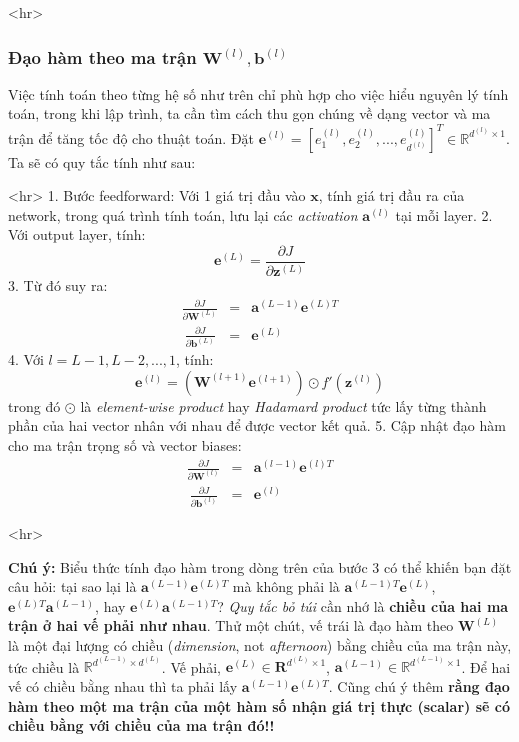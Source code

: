 <hr> 
 
 
 
\subsubsection{Đạo hàm theo ma trận $\mathbf{W}^{(l)}, \mathbf{b}^{(l)}$}
Việc tính toán theo từng hệ số như trên chỉ phù hợp cho việc hiểu nguyên lý tính toán, trong khi lập trình, ta cần tìm cách thu gọn chúng về dạng vector và ma trận để tăng tốc độ cho thuật toán. Đặt $\mathbf{e}^{(l)} = [e_1^{(l)}, e_2^{(l)}, ..., e_{d^{(l)}}^{(l)}]^T \in \mathbb{R}^{d^{(l)}\times 1} $. Ta sẽ có quy tắc tính như sau: 
 
<hr> 
1. Bước feedforward: Với 1 giá trị đầu vào $\mathbf{x}$, tính giá trị đầu ra của network, trong quá trình tính toán, lưu lại các \textit{activation} $\mathbf{a}^{(l)}$ tại mỗi layer. 
2. Với output layer, tính: \begin{equation*}\mathbf{e}^{(L)} = \frac{\partial J}{\partial \mathbf{z}^{(L)}}\end{equation*} 
3. Từ đó suy ra: 
\begin{eqnarray} 
\frac{\partial J}{\partial \mathbf{W}^{(L)}} &=& \mathbf{a}^{(L-1)}\mathbf{e}^{(L)T}\\\ 
\frac{\partial J}{\partial \mathbf{b}^{(L)}} &=&  \mathbf{e}^{(L)} 
\end{eqnarray} 
4. Với $l = L-1, L-2, ..., 1$, tính: 
\begin{equation*} 
\mathbf{e}^{(l)} = \left( \mathbf{W}^{(l+1)} \mathbf{e}^{(l+1)} \right) \odot f'(\mathbf{z}^{(l)}) 
\end{equation*} 
trong đó $\odot$ là \textit{element-wise product} hay \textit{Hadamard product} tức lấy từng thành phần của hai vector nhân với nhau để được vector kết quả. 
5. Cập nhật đạo hàm cho ma trận trọng số và vector biases: 
\begin{eqnarray} 
\frac{\partial J}{\partial \mathbf{W}^{(l)}} &=& \mathbf{a}^{(l-1)}\mathbf{e}^{(l)T}\\\ 
\frac{\partial J}{\partial \mathbf{b}^{(l)}} &=& \mathbf{e}^{(l)} 
\end{eqnarray} 
 
<hr> 
 
\textbf{Chú ý:} Biểu thức tính đạo hàm trong dòng trên của bước 3 có thể khiến bạn đặt câu hỏi: tại sao lại là $\mathbf{a}^{(L-1)}\mathbf{e}^{(L)T}$ mà không phải là $\mathbf{a}^{(L-1)T}\mathbf{e}^{(L)}$, $\mathbf{e}^{(L)T}\mathbf{a}^{(L-1)}$, hay $\mathbf{e}^{(L)}\mathbf{a}^{(L-1)T}$? \textit{Quy tắc bỏ túi} cần nhớ là \textbf{chiều của hai ma trận ở hai vế phải như nhau}. Thử một chút, vế trái là đạo hàm theo $\mathbf{W}^{(L)}$ là một đại lượng có chiều (\textit{dimension}, not \textit{afternoon}) bằng chiều của ma trận này, tức chiều là $\mathbb{R}^{d^{(L-1)}\times d^{(L)}}$. Vế phải, $\mathbf{e}^{(L)} \in \mathbf{R}^{d^{(L)} \times 1}$, $\mathbf{a}^{(L-1)} \in \mathbb{R}^{d^{(L-1)} \times 1}$. Để hai vế có chiều bằng nhau thì ta phải lấy $\mathbf{a}^{(L-1)} \mathbf{e}^{(L)T}$. Cũng chú ý thêm \textbf{rằng đạo hàm theo một ma trận của một hàm số nhận giá trị thực (scalar) sẽ có chiều bằng với chiều của ma trận đó!!} 
 
